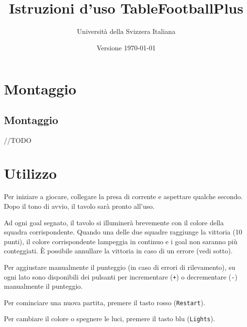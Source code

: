 \documentclass[12pt]{article}
\title{Istruzioni d'uso TableFootballPlus}
\author{Università della Svizzera Italiana}
\date{Versione \today}
\begin{document}
\maketitle
\tableofcontents
\newpage

\section{Montaggio}

	\subsection{Montaggio}

		//TODO
		
		

\section{Utilizzo}

	Per iniziare a giocare, collegare la presa di corrente e aspettare qualche secondo. Dopo il tono di avvio, il tavolo sarà pronto all'uso.
	
	Ad ogni goal segnato, il tavolo si illuminerà brevemente con il colore della squadra corrispondente. Quando una delle due squadre raggiunge la vittoria (10 punti), il colore corrispondente lampeggia in continuo e i goal non saranno più conteggiati. È possibile annullare la vittoria in caso di un errore (vedi sotto).
	
	Per aggiustare manualmente il punteggio (in caso di errori di rilevamento), su ogni lato sono disponibili dei pulsanti per incrementare (\texttt{+}) o decrementare (\texttt{-}) manualmente il punteggio.
	
	Per cominciare una nuova partita, premere il tasto rosso (\texttt{Restart}).
	
	Per cambiare il colore o spegnere le luci, premere il tasto blu (\texttt{Lights}).
	
\end{document}
